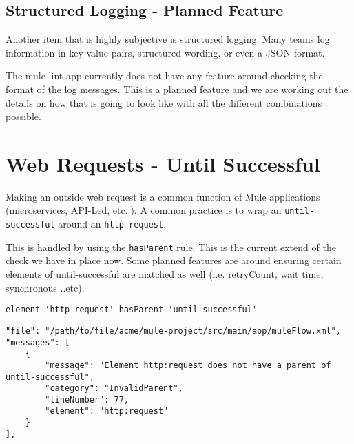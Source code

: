 \documentclass[a4paper,12pt]{article} %
\begin{document}
\subsection{Structured Logging - Planned Feature}
Another item that is highly subjective is structured logging. Many teams log information in key value pairs, structured wording, or even a JSON format.

The mule-lint app currently does not have any feature around checking the format of the log messages. This is a planned feature and we are working out the details on how that is going to look like with all the different combinations possible.


\section{Web Requests - Until Successful}

Making an outside web request is a common function of Mule applications (microservices, API-Led, etc..). A common practice is to wrap an \verb|until-successful| around an \verb|http-request|.

This is handled by using the \verb|hasParent| rule. This is the current extend of the check we have in place now. Some planned features are around ensuring certain elements of until-successful are matched as well (i.e. retryCount, wait time, synchronous ..etc).

\begin{Verbatim}[fontsize=\small]
element 'http-request' hasParent 'until-successful'
\end{Verbatim}

\begin{Verbatim}[fontsize=\small]
"file": "/path/to/file/acme/mule-project/src/main/app/muleFlow.xml",
"messages": [
    {
        "message": "Element http:request does not have a parent of until-successful",
        "category": "InvalidParent",
        "lineNumber": 77,
        "element": "http:request"
    }
],
\end{Verbatim}

\end{document}
